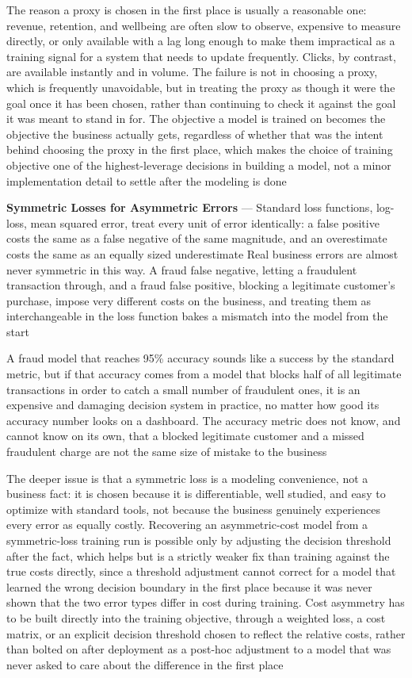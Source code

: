 The reason a proxy is chosen in the first place is usually a reasonable one:
revenue, retention, and wellbeing are often slow to observe, expensive to measure
directly, or only available with a lag long enough to make them impractical as a
training signal for a system that needs to update frequently. Clicks, by
contrast, are available instantly and in volume. The failure is not in choosing
a proxy, which is frequently unavoidable, but in treating the proxy as though it
were the goal once it has been chosen, rather than continuing to check it against
the goal it was meant to stand in for. The objective a model is trained on
becomes the objective the business actually gets, regardless of whether that was
the intent behind choosing the proxy in the first place, which makes the choice
of training objective one of the highest-leverage decisions in building a model,
not a minor implementation detail to settle after the modeling is done

\textbf{Symmetric Losses for Asymmetric Errors} --- Standard loss functions, log-loss,
mean squared error, treat every unit of error identically: a false positive costs
the same as a false negative of the same magnitude, and an overestimate costs
the same as an equally sized underestimate Real business errors are almost never
symmetric in this way. A fraud false negative, letting a fraudulent transaction
through, and a fraud false positive, blocking a legitimate customer's purchase, impose
very different costs on the business, and treating them as interchangeable in
the loss function bakes a mismatch into the model from the start

A fraud model that reaches 95\% accuracy sounds like a success by the standard
metric, but if that accuracy comes from a model that blocks half of all legitimate
transactions in order to catch a small number of fraudulent ones, it is an
expensive and damaging decision system in practice, no matter how good its accuracy
number looks on a dashboard. The accuracy metric does not know, and cannot know on
its own, that a blocked legitimate customer and a missed fraudulent charge are
not the same size of mistake to the business

The deeper issue is that a symmetric loss is a modeling convenience, not a
business fact: it is chosen because it is differentiable, well studied, and easy
to optimize with standard tools, not because the business genuinely experiences
every error as equally costly. Recovering an asymmetric-cost model from a symmetric-loss
training run is possible only by adjusting the decision threshold after the fact,
which helps but is a strictly weaker fix than training against the true costs
directly, since a threshold adjustment cannot correct for a model that learned the
wrong decision boundary in the first place because it was never shown that the two
error types differ in cost during training. Cost asymmetry has to be built
directly into the training objective, through a weighted loss, a cost matrix, or
an explicit decision threshold chosen to reflect the relative costs, rather than
bolted on after deployment as a post-hoc adjustment to a model that was never
asked to care about the difference in the first place

